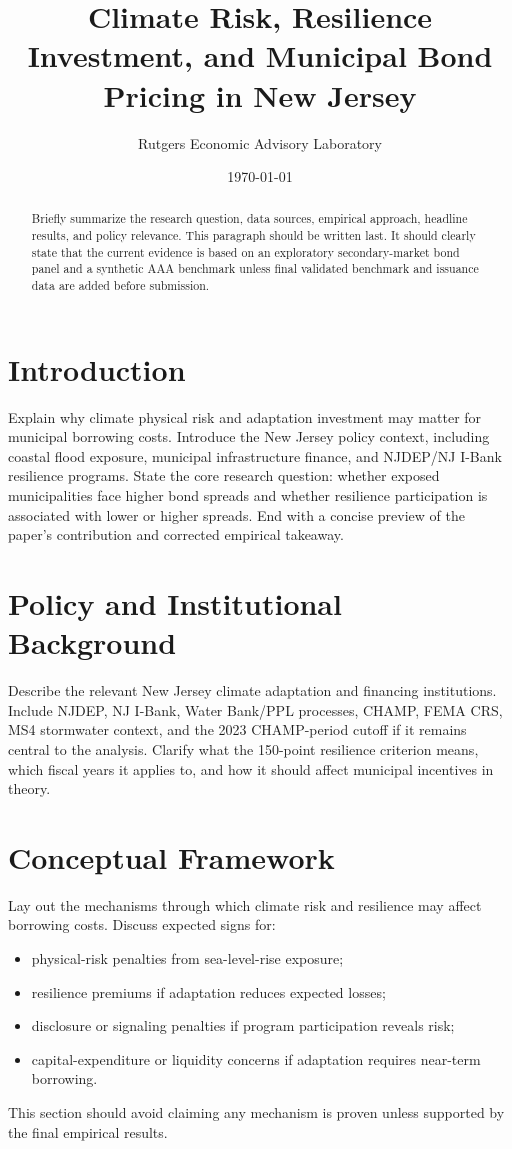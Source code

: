 \documentclass[12pt]{article}
\title{Climate Risk, Resilience Investment, and Municipal Bond Pricing in New Jersey}
\author{Rutgers Economic Advisory Laboratory}
\date{\today}
\begin{document}
\maketitle

\begin{abstract}
Briefly summarize the research question, data sources, empirical approach, headline results, and policy relevance.
This paragraph should be written last.
It should clearly state that the current evidence is based on an exploratory secondary-market bond panel and a synthetic AAA benchmark unless final validated benchmark and issuance data are added before submission.
\end{abstract}

\section{Introduction}
Explain why climate physical risk and adaptation investment may matter for municipal borrowing costs.
Introduce the New Jersey policy context, including coastal flood exposure, municipal infrastructure finance, and NJDEP/NJ I-Bank resilience programs.
State the core research question: whether exposed municipalities face higher bond spreads and whether resilience participation is associated with lower or higher spreads.
End with a concise preview of the paper's contribution and corrected empirical takeaway.

\section{Policy and Institutional Background}
Describe the relevant New Jersey climate adaptation and financing institutions.
Include NJDEP, NJ I-Bank, Water Bank/PPL processes, CHAMP, FEMA CRS, MS4 stormwater context, and the 2023 CHAMP-period cutoff if it remains central to the analysis.
Clarify what the 150-point resilience criterion means, which fiscal years it applies to, and how it should affect municipal incentives in theory.

\section{Conceptual Framework}
Lay out the mechanisms through which climate risk and resilience may affect borrowing costs.
Discuss expected signs for:
\begin{itemize}[leftmargin=*]
    \item physical-risk penalties from sea-level-rise exposure;
    \item resilience premiums if adaptation reduces expected losses;
    \item disclosure or signaling penalties if program participation reveals risk;
    \item capital-expenditure or liquidity concerns if adaptation requires near-term borrowing.
\end{itemize}
This section should avoid claiming any mechanism is proven unless supported by the final empirical results.
\end{document}
